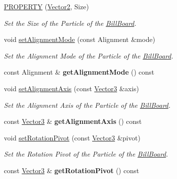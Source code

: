 \begin{DoxyCompactItemize}
\hyperlink{class_i_dream_sky_1_1_bill_board_a8d165bc9a772ec1ca2773082831af51a}{P\+R\+O\+P\+E\+R\+TY} (\hyperlink{class_i_dream_sky_1_1_vector2}{Vector2}, Size)
\begin{DoxyCompactList}\small\item\em Set the Size of the Particle of the \hyperlink{class_i_dream_sky_1_1_bill_board}{Bill\+Board}. \end{DoxyCompactList}\item 
void \hyperlink{class_i_dream_sky_1_1_bill_board_af5898fa7b3af0a3b2c919d93c83a6c43}{set\+Alignment\+Mode} (const Alignment \&mode)
\begin{DoxyCompactList}\small\item\em Set the Alignment Mode of the Particle of the \hyperlink{class_i_dream_sky_1_1_bill_board}{Bill\+Board}. \end{DoxyCompactList}\item 
const Alignment \& {\bfseries get\+Alignment\+Mode} () const \hypertarget{class_i_dream_sky_1_1_bill_board_a7449d9a0d23e0c584e4d2a73afd233a8}{}\label{class_i_dream_sky_1_1_bill_board_a7449d9a0d23e0c584e4d2a73afd233a8}

\item 
void \hyperlink{class_i_dream_sky_1_1_bill_board_afebe7edeb5174befb91e9f9205678c89}{set\+Alignment\+Axis} (const \hyperlink{class_i_dream_sky_1_1_vector3}{Vector3} \&axis)
\begin{DoxyCompactList}\small\item\em Set the Alignment Axis of the Particle of the \hyperlink{class_i_dream_sky_1_1_bill_board}{Bill\+Board}. \end{DoxyCompactList}\item 
const \hyperlink{class_i_dream_sky_1_1_vector3}{Vector3} \& {\bfseries get\+Alignment\+Axis} () const \hypertarget{class_i_dream_sky_1_1_bill_board_ade8cdb1b707c9c408da541d9693802e1}{}\label{class_i_dream_sky_1_1_bill_board_ade8cdb1b707c9c408da541d9693802e1}

\item 
void \hyperlink{class_i_dream_sky_1_1_bill_board_adf4d1c65adcbf8b3ad6767aaa0b18fb5}{set\+Rotation\+Pivot} (const \hyperlink{class_i_dream_sky_1_1_vector3}{Vector3} \&pivot)
\begin{DoxyCompactList}\small\item\em Set the Rotation Pivot of the Particle of the \hyperlink{class_i_dream_sky_1_1_bill_board}{Bill\+Board}. \end{DoxyCompactList}\item 
const \hyperlink{class_i_dream_sky_1_1_vector3}{Vector3} \& {\bfseries get\+Rotation\+Pivot} () const \hypertarget{class_i_dream_sky_1_1_bill_board_a35d961b382d6c9199a6c2fb0f853fd40}{}\label{class_i_dream_sky_1_1_bill_board_a35d961b382d6c9199a6c2fb0f853fd40}

\end{DoxyCompactItemize}
